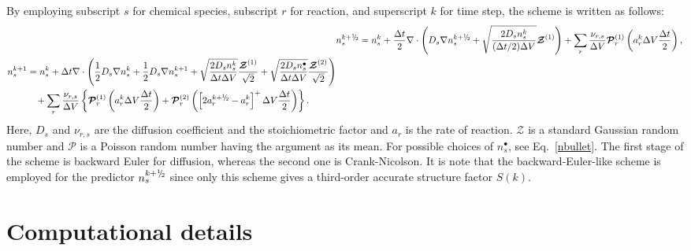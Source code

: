 \documentclass{article}
\def\mZb {\bm{\mathcal{Z}}}
\def\mPb {\bm{\mathcal{P}}}
\def\myhalf {\sfrac{1}{2}}
\newcommand{\sfrac}[2]{\mathchoice
  {\kern0em\raise.5ex\hbox{\the\scriptfont0 #1}\kern-.15em/
   \kern-.15em\lower.25ex\hbox{\the\scriptfont0 #2}}
  {\kern0em\raise.5ex\hbox{\the\scriptfont0 #1}\kern-.15em/
   \kern-.15em\lower.25ex\hbox{\the\scriptfont0 #2}}
  {\kern0em\raise.5ex\hbox{\the\scriptscriptfont0 #1}\kern-.2em/
   \kern-.15em\lower.25ex\hbox{\the\scriptscriptfont0 #2}}
  {#1\!/#2}}
\begin{document}
By employing subscript $s$ for chemical species, subscript $r$ for reaction, and superscript $k$ for time step, the scheme is written as follows:
\begin{subequations}
\begin{align}
&n_s^{k+\myhalf} = n_s^k + \frac{\Delta t}{2} \nabla\cdot\left(D_s\nabla n_s^{k+\myhalf}
+ \sqrt{\frac{2 D_s n_s^k}{(\Delta t/2)\Delta V}}\mZb^{(1)}\right)
+\sum_r \frac{\nu_{r,s}}{\Delta V}\mPb^{(1)}_r\left(a_r^k\Delta V\frac{\Delta t}{2}\right),
\\
\begin{split}
&n_s^{k+1} = n_s^k + \Delta t \nabla\cdot\left( \frac{1}{2} D_s \nabla n_s^k + \frac{1}{2} D_s \nabla n_s^{k+1}
+ \sqrt{\frac{2 D_s n_s^k}{\Delta t\Delta V}}\frac{\mZb^{(1)}}{\sqrt{2}}
+ \sqrt{\frac{2 D_s n_s^\bullet}{\Delta t\Delta V}}\frac{\mZb^{(2)}}{\sqrt{2}}\right)
\\
&\quad\quad\quad +\sum_r \frac{\nu_{r,s}}{\Delta V}\left\{
\mPb^{(1)}_r\left(a_r^k\Delta V\frac{\Delta t}{2}\right)
+\mPb^{(2)}_r\left(\left[2 a_r^{k+\myhalf}-a_r^k\right]^+\Delta V\frac{\Delta t}{2}\right)\right\}.
\end{split}
\end{align}
\end{subequations}
Here, $D_s$ and $\nu_{r,s}$ are the diffusion coefficient and the stoichiometric factor and $a_r$ is the rate of reaction.
$\mZb$ is a standard Gaussian random number and $\mPb$ is a Poisson random number having the argument as its mean.
For possible choices of $n_s^\bullet$, see Eq.~\eqref{nbullet}.
The first stage of the scheme is backward Euler for diffusion, whereas the second one is Crank-Nicolson.
It is note that the backward-Euler-like scheme is employed for the predictor $n_s^{k+\myhalf}$ since only this scheme gives a third-order accurate structure factor $S(k)$. 

\section{Computational details}
\end{document}
